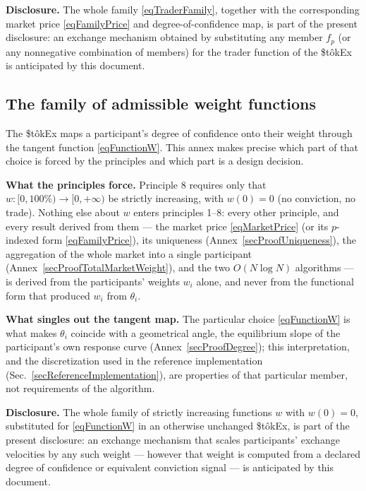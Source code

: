 \documentclass[letterpaper]{article}
\newcommand{\StokEx}{\$t\^{o}kEx}
\begin{document}
\textbf{Disclosure.} The whole family \eqref{eqTraderFamily}, together with the corresponding market price \eqref{eqFamilyPrice} and degree-of-confidence map, is part of the present disclosure: an exchange mechanism obtained by substituting any member $f_p$ (or any nonnegative combination of members) for the trader function of the \StokEx{} is anticipated by this document.

\subsection{The family of admissible weight functions}\label{secWeightFamily}

The \StokEx{} maps a participant's degree of confidence onto their weight through the tangent function \eqref{eqFunctionW}. This annex makes precise which part of that choice is forced by the principles and which part is a design decision.

\textbf{What the principles force.} Principle 8 requires only that $w: [0,100\%) \to [0,+\infty)$ be strictly increasing, with $w(0) = 0$ (no conviction, no trade). Nothing else about $w$ enters principles 1--8: every other principle, and every result derived from them --- the market price \eqref{eqMarketPrice} (or its $p$-indexed form \eqref{eqFamilyPrice}), its uniqueness (Annex~\ref{secProofUniqueness}), the aggregation of the whole market into a single participant (Annex~\ref{secProofTotalMarketWeight}), and the two $O(N \log N)$ algorithms --- is derived from the participants' weights $w_i$ alone, and never from the functional form that produced $w_i$ from $\theta_i$.

\textbf{What singles out the tangent map.} The particular choice \eqref{eqFunctionW} is what makes $\theta_i$ coincide with a geometrical angle, the equilibrium slope of the participant's own response curve (Annex~\ref{secProofDegree}); this interpretation, and the discretization used in the reference implementation (Sec.~\ref{secReferenceImplementation}), are properties of that particular member, not requirements of the algorithm.

\textbf{Disclosure.} The whole family of strictly increasing functions $w$ with $w(0) = 0$, substituted for \eqref{eqFunctionW} in an otherwise unchanged \StokEx{}, is part of the present disclosure: an exchange mechanism that scales participants' exchange velocities by any such weight --- however that weight is computed from a declared degree of confidence or equivalent conviction signal --- is anticipated by this document.
\end{document}
